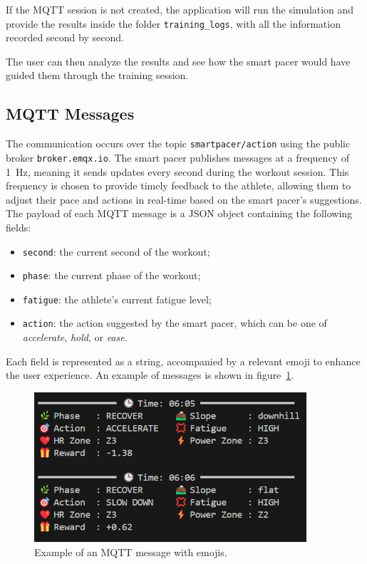 If the MQTT session is not created, the application will run the simulation and provide the results inside the folder \texttt{training\_logs}, with all the information recorded second by second. 

The user can then analyze the results and see how the smart pacer would have guided them through the training session.

\subsection{MQTT Messages}\label{subsec:mqtt-messages}
The communication occurs over the topic \texttt{smartpacer/action} using the public broker
\texttt{broker.emqx.io}. The smart pacer publishes messages at a frequency of 1~Hz, meaning it sends
updates every second during the workout session. This frequency is chosen to provide timely feedback
to the athlete, allowing them to adjust their pace and actions in real-time based on the smart pacer's
suggestions. The payload of each MQTT message is a JSON object containing the following fields:
\begin{itemize}
  \item \texttt{second}: the current second of the workout;
  \item \texttt{phase}: the current phase of the workout;
  \item \texttt{fatigue}: the athlete's current fatigue level;
  \item \texttt{action}: the action suggested by the smart pacer, which can be one of
    \emph{accelerate}, \emph{hold}, or \emph{ease}.
\end{itemize}

Each field is represented as a string, accompanied by a relevant emoji to enhance the user experience.
An example of messages is shown in figure~\ref{fig:mqtt_message_example_emoji}.

\begin{figure}[htbp]
    \centering
    \includegraphics[width=0.90\textwidth]{images/mqtt_message.png}
    \caption{Example of an MQTT message with emojis.}
    \label{fig:mqtt_message_example_emoji}
\end{figure}

